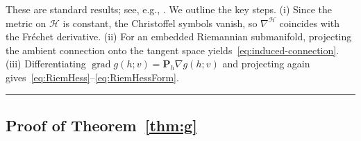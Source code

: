 \documentclass[twoside,11pt]{article}
\newcommand{\BlackBoxProof}{\rule{1.5ex}{1.5ex}}
\renewenvironment{proof}{\par\noindent{\bf Proof\ }}{\hfill\BlackBoxProof\par\medskip}
\renewcommand{\P}{\mathbf{P}}
\newcommand{\grad}{\operatorname{grad} }
\begin{document}
\begin{proof}
These are standard results; see, e.g., \citet[Chapter~3]{absil2008optimization}. We outline the key steps. (i) Since the metric on $\mathcal H$ is constant, the Christoffel symbols vanish, so $\nabla^{\mathcal H}$ coincides with the Fr\'echet derivative. (ii) For an embedded Riemannian submanifold, projecting the ambient connection onto the tangent space yields~\eqref{eq:induced-connection}. (iii) Differentiating $\grad g(h; v)= \P_h\nabla g(h; v)$ and projecting again gives~\eqref{eq:RiemHess}--\eqref{eq:RiemHessForm}.
\end{proof}

\subsection{Proof of Theorem~\ref{thm:g}}\label{app:proof-thm-g}
\end{document}
